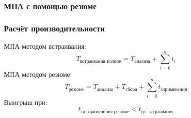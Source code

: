 \documentclass[hyperref={pdfpagelabels=false}]{beamer}
\begin{document}
\begin{frame}
\frametitle{МПА с помощью резюме}
\begin{figure}[h]
\end{figure}
\end{frame}
\begin{frame}
\frametitle{Расчёт производительности}
МПА методом встраивания:
\begin{equation*}
 T_{\text{встраивания полное}} = T_{\text{анализа}} + \sum_{i = 0}^{n} t_i 
\end{equation*}
МПА методом резюме:
\begin{equation*}
 T_{\text{резюме}} = T_{\text{анализа}} + T_{\text{сбора}} + \sum_{i = 0}^{n} t_{i \text{применения}}
\end{equation*}
Выигрыш при:
\begin{equation*}
 t_{\text{ср. применения резюме}} <  t_{\text{ср. встраивания}}
\end{equation*}
\end{frame}

\end{document}
